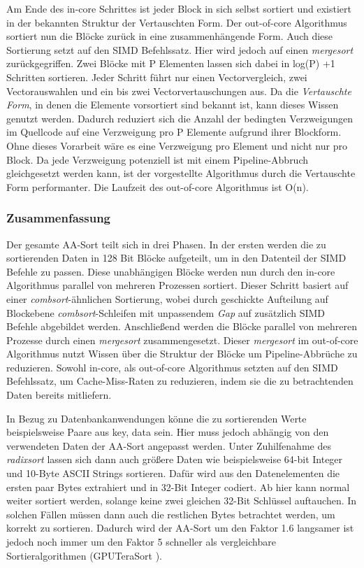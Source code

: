 Am Ende des in-core Schrittes ist jeder Block in sich selbst sortiert und existiert in der bekannten Struktur der Vertauschten Form. Der out-of-core Algorithmus sortiert nun die Blöcke zurück in eine zusammenhängende Form. Auch diese Sortierung setzt auf den SIMD Befehlssatz. Hier wird jedoch auf einen \textit{mergesort} zurückgegriffen. Zwei Blöcke mit P Elementen lassen sich dabei in log(P) +1 Schritten sortieren. Jeder Schritt führt nur einen Vectorvergleich, zwei Vectorauswahlen und ein bis zwei Vectorvertauschungen aus. Da die \textit{Vertauschte Form}, in denen die Elemente vorsortiert sind bekannt ist, kann dieses Wissen genutzt werden. Dadurch reduziert sich die Anzahl der bedingten Verzweigungen im Quellcode auf eine Verzweigung pro P Elemente aufgrund ihrer Blockform. Ohne dieses Vorarbeit wäre es eine Verzweigung pro Element und nicht nur pro Block. Da jede Verzweigung potenziell ist mit einem Pipeline-Abbruch gleichgesetzt werden kann, ist der vorgestellte Algorithmus durch die Vertauschte Form performanter. Die Laufzeit des out-of-core Algorithmus ist O(n).

\subsubsection*{Zusammenfassung}
\label{sec:AA-Sort_Zusammenfassung}

Der gesamte AA-Sort teilt sich in drei Phasen. In der ersten werden die zu sortierenden Daten in 128 Bit Blöcke aufgeteilt, um in den Datenteil der SIMD Befehle zu passen. Diese unabhängigen Blöcke werden nun durch den in-core Algorithmus parallel von mehreren Prozessen sortiert. Dieser Schritt basiert auf einer \textit{combsort}-ähnlichen Sortierung, wobei durch geschickte Aufteilung auf Blockebene \textit{combsort}-Schleifen mit unpassendem \textit{Gap} auf zusätzlich SIMD Befehle abgebildet werden. Anschließend werden die Blöcke parallel von mehreren Prozesse durch einen \textit{mergesort} zusammengesetzt. Dieser \textit{mergesort} im out-of-core Algorithmus nutzt Wissen über die Struktur der Blöcke um Pipeline-Abbrüche zu reduzieren. Sowohl in-core, als out-of-core Algorithmus setzten auf den SIMD Befehlssatz, um Cache-Miss-Raten zu reduzieren, indem sie die zu betrachtenden Daten bereits mitliefern.

In Bezug zu Datenbankanwendungen könne die zu sortierenden Werte beispielsweise Paare aus {key, data} sein. Hier muss jedoch abhängig von den verwendeten Daten der AA-Sort angepasst werden. Unter Zuhilfenahme des \textit{radixsort} lassen sich dann auch größere Daten wie beispielsweise 64-bit Integer und 10-Byte ASCII Strings sortieren. Dafür wird aus den Datenelementen die ersten paar Bytes extrahiert und in 32-Bit Integer codiert. Ab hier kann normal weiter sortiert werden, solange keine zwei gleichen 32-Bit Schlüssel auftauchen. In solchen Fällen müssen dann auch die restlichen Bytes betrachtet werden, um korrekt zu sortieren. Dadurch wird der AA-Sort um den Faktor 1.6 langsamer ist jedoch noch immer um den Faktor 5 schneller als vergleichbare Sortieralgorithmen (GPUTeraSort \cite{GOVINDARAJU}).

